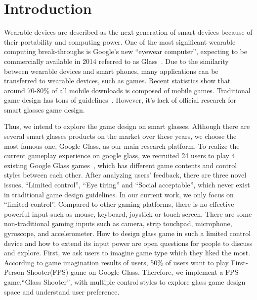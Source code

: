 \documentclass{sigchi}
\begin{document}




\section{Introduction}
Wearable devices are described as the next generation of smart devices because of their portability and computing power. One of the most significant wearable computing break-throughs is Google's new ``eyewear computer'', expecting to be commercially available in 2014 referred to as Glass~\cite{glass}. Due to the similarity between wearable devices and smart phones, many applications can be transferred to wearable devices, such as games. Recent statistics show that around 70-80\% of all mobile downloads is composed of mobile games\cite{statistics,infographic}. Traditional game design has tons of guidelines~\cite{videogame,mobilegame,bodygame,gameflow,argame,wearable}. However, it's lack of official research for smart glasses game design.%

Thus, we intend to explore the game design on smart glasses. Although there are several smart glasses products on the market over these years, we choose the most famous one, Google Glass, as our main research platform. To realize the current gameplay experience on google glass, we recruited 24 users to play 4 existing Google Glass games~\cite{minigame}, which has different game contents and control styles between each other. 
After analyzing users’ feedback, there are three novel issues, ``Limited control'', ``Eye tiring'' and ``Social acceptable'', which never exist in traditional game design guidelines. In our current work, we only focus on ``limited control''. Compared to other gaming platforms, there is no effective powerful input such as mouse, keyboard, joystick or touch screen. There are some non-traditional gaming inputs such as camera, strip touchpad, microphone, gyroscope, and accelerometer. How to design glass game in such a limited control device and how to extend its input power are open questions for people to discuss and explore. First, we ask users to imagine game type which they liked the most. According to game imagination results of users, 50\% of users want to play First-Person Shooter(FPS) game on Google Glass. Therefore, we implement a FPS game,``Glass Shooter'', with multiple control styles to explore glass game design space and understand user preference.
\end{document}

